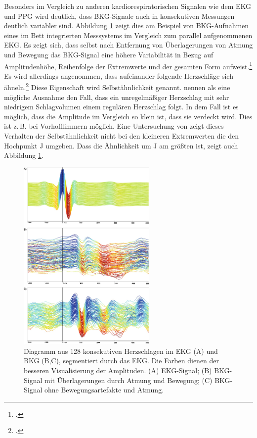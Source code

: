 	
	Besonders im Vergleich zu anderen kardiorespiratorischen Signalen wie dem \ac{EKG} und \ac{PPG} wird deutlich, dass \ac{BKG}-Signale auch in konsekutiven Messungen deutlich variabler sind. Abbildung \ref{fig:variabilitaet} zeigt dies am Beispiel von \ac{BKG}-Aufnahmen eines im Bett integrierten Messsystems im Vergleich zum parallel aufgenommenen \ac{EKG}. Es zeigt sich, dass selbst nach Entfernung von Überlagerungen von Atmung  und Bewegung das \ac{BKG}-Signal eine höhere Variabilität in Bezug auf Amplitudenhöhe, Reihenfolge der Extremwerte und der gesamten Form aufweist.\footcite[Vgl.][]{Zink2017} Es wird allerdings angenommen, dass aufeinander folgende Herzschläge sich ähneln.\footcite[Vgl.][]{Bruser2013} Diese Eigenschaft wird Selbstähnlichkeit genannt. \citeauthor{Bruser2013} nennen als eine mögliche Ausnahme den Fall, dass ein unregelmäßiger Herzschlag mit sehr niedrigem Schlagvolumen einem regulären Herzschlag folgt. In dem Fall ist es möglich, dass die Amplitude im Vergleich so klein ist, dass sie verdeckt wird. Dies ist z.\,B. bei Vorhofflimmern möglich. Eine Untersuchung von \citeauthor{Rosales2012} zeigt dieses Verhalten der Selbstähnlichkeit nicht bei den kleineren Extremwerten die den Hochpunkt J umgeben. Dass die Ähnlichkeit um J am größten ist, zeigt auch Abbildung \ref{fig:variabilitaet}.
	
	\begin{figure}[H]
		\centering
		\includegraphics[width=0.6\textwidth]{pic/Variabilitaet.jpg}
		\caption[Visualisierung der Variabilität des \ac{BKG}-Signals]{Diagramm aus 128 konsekutiven Herzschlagen im EKG (A) und BKG (B,C), segmentiert durch das EKG. Die Farben dienen der besseren Visualisierung der Amplituden. (A) EKG-Signal; (B) BKG-Signal mit Überlagerungen durch Atmung und Bewegung; (C) \ac{BKG}-Signal ohne Bewegungsartefakte und Atmung.\protect\footnotemark}
		\label{fig:variabilitaet}
	\end{figure}
	
